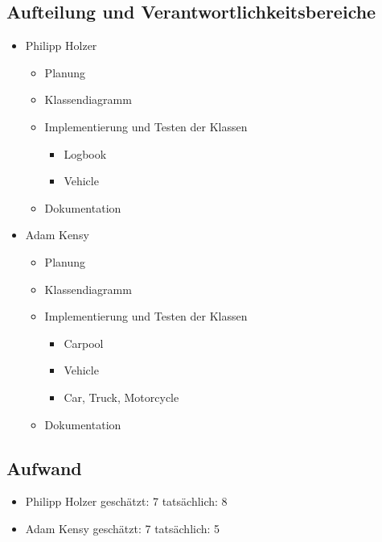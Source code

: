 \subsection{Aufteilung und Verantwortlichkeitsbereiche}
\begin{itemize}
	\item Philipp Holzer
		\begin{itemize}
		\item Planung
		\item Klassendiagramm
		\item Implementierung und Testen der Klassen
			\begin{itemize}
			\item Logbook
			\item Vehicle
			\end{itemize}
		\item Dokumentation
		\end{itemize}
	\item Adam Kensy
		\begin{itemize}
		\item Planung
		\item Klassendiagramm
		\item Implementierung und Testen der Klassen
			\begin{itemize}
			\item Carpool
			\item Vehicle
			\item Car, Truck, Motorcycle
			\end{itemize}
		\item Dokumentation
		\end{itemize}
\end{itemize}

\subsection{Aufwand}
\begin{itemize}
	\item Philipp Holzer		\tab geschätzt: 7	\tab tatsächlich: 8
	\item Adam Kensy		\tab  geschätzt:	7	\tab  tatsächlich: 5
\end{itemize}



